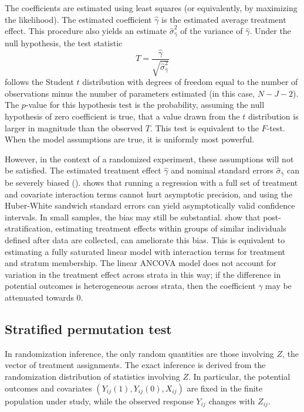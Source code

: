 \documentclass[12pt]{article}
\begin{document}
The coefficients are estimated using least squares (or equivalently, by maximizing the likelihood).
The estimated coefficient $\hat{\gamma}$ is the estimated average treatment effect. 
This procedure also yields an estimate $\hat{\sigma}_{\hat{\gamma}}^2$ of the variance of $\hat{\gamma}$.
Under the null hypothesis, the test statistic 
$$ T = \frac{\hat{\gamma}}{\sqrt{ \hat{\sigma}_{\hat{\gamma}}^2}}$$
follows the Student $t$ distribution with degrees of freedom equal to the number of observations minus the number of parameters estimated (in this case, $N - J - 2$).
The $p$-value for this hypothesis test is the probability, assuming the null hypothesis of zero coefficient is true, that a value drawn from the $t$ distribution is larger in magnitude than the observed $T$.
This test is equivalent to the $F$-test.
When the model assumptions are true, it is uniformly most powerful.

However, in the context of a randomized experiment, these assumptions will not be satisfied.
The estimated treatment effect $\hat{\gamma}$ and nominal standard errors $\hat{\sigma}_{\hat{\gamma}}$ can be severely biased (\cite{freedman_regression_2008, lin_agnostic_2013}).
\cite{lin_agnostic_2013} shows that running a regression with a full set of treatment and covariate interaction terms cannot hurt asymptotic precision, and using the Huber-White sandwich standard errors can yield asymptotically valid confidence intervals.
In small samples, the bias may still be substantial.
\cite{miratrix_adjusting_2013} show that post-stratification, estimating treatment effects within groups of similar individuals defined after data are collected, can ameliorate this bias.
This is equivalent to estimating a fully saturated linear model with interaction terms for treatment and stratum membership.
The linear ANCOVA model does not account for variation in the treatment effect across strata in this way;
if the difference in potential outcomes is heterogeneous across strata, then the coefficient $\gamma$ may be attenuated towards 0.


\subsection{Stratified permutation test}\label{subsec:strat_perm_test}
In randomization inference, the only random quantities are those involving $Z$, the vector of treatment assignments.
The exact inference is derived from the randomization distribution of statistics involving $Z$.
In particular, the potential outcomes and covariates $(Y_{ij}(1), Y_{ij}(0), X_{ij})$ are fixed in the finite population under study, while the observed response $Y_{ij}$ changes with $Z_{ij}$.
\end{document}
